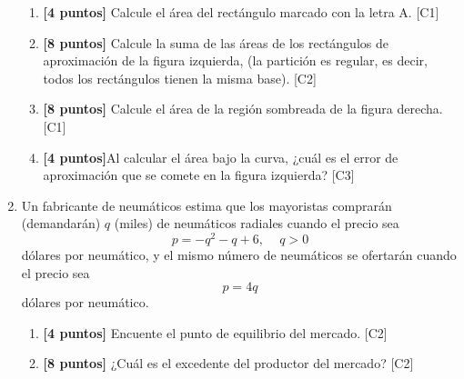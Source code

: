 \documentclass[10pt]{exam}
\begin{document}
\begin{enumerate}
\begin{enumerate}
    \item \textbf{[4 puntos]} Calcule el área del rectángulo marcado con la letra A. \hfill{[C1]}
    \item \textbf{[8 puntos]} Calcule la suma de las áreas de los rectángulos de aproximación de la figura izquierda, (la partición es regular, es decir, todos los rectángulos tienen la misma base). \hfill{[C2]}
    \item \textbf{[8 puntos]} Calcule el área de la región sombreada de la figura derecha. \hfill{[C1]}

    \item \textbf{[4 puntos]}Al calcular el área bajo la curva, ¿cuál es el error de aproximación que se comete en la figura izquierda?  \hfill{[C3]}


\end{enumerate}

\item Un fabricante de neumáticos estima que los mayoristas comprarán (demandarán) $q$ (miles) de neumáticos radiales cuando el precio sea $$p=-q^2-q+6,\,\,\,\,\,\,\, q>0$$
dólares por neumático, y el mismo número de neumáticos se ofertarán cuando el precio sea $$p=4q$$
dólares por neumático.

\begin{enumerate}
    \item \textbf{[4 puntos]} Encuente el punto de equilibrio del mercado. \hfill{[C2]}
    
    \item \textbf{[8 puntos]} ¿Cuál es el excedente del productor del mercado? \hfill{[C2]}
\end{enumerate}

\end{enumerate}
\end{document}

